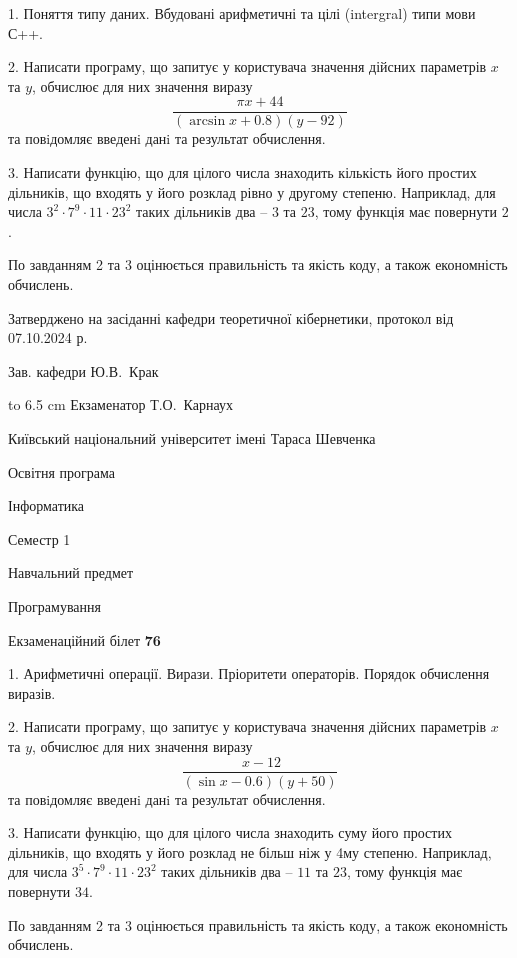 \documentclass[12pt, ukrainian]{article}
\begin{document}
{%
1. Поняття типу даних. Вбудовані арифметичні та цілі (intergral) типи мови С++.%
\par
2. Написати програму, що запитує у користувача значення дійсних параметрів $x$ та $y$, обчислює для них значення виразу 
$$\frac{\pi x + 44}{(\arcsin x + 0.8) (y - 92)}$$ 
та повiдомляє введенi данi та результат обчислення.

\par
3. Написати функцію, що для цілого числа знаходить кількість його простих дільників, що входять у його розклад рівно у другому степеню. Наприклад, для числа $3^2{\cdot}7^9{\cdot}11{\cdot}23^{2}$ таких дільників два – $3$ та $23$, тому функція має повернути $2$.

По завданням 2 та 3 оцінюється правильність та якість коду, а також економність обчислень.

}
{\smallskip\smallskip \begin {scriptsize} Затверджено на засіданні кафедри теоретичної кібернетики, протокол   від   07.10.2024 р.\par\smallskip\smallskip\smallskip\smallskip
{\parbox {6.5 cm} {Зав. кафедри \dotfill Ю.В.~Крак}}\hspace {0.7cm} {\hbox to 6.5 cm { Екзаменатор \dotfill Т.О.~Карнаух}} \end{scriptsize}}
\newpage
{{\begin {scriptsize}\par
{ \center  Київський національний університет імені Тараса Шевченка \par}
{\parbox {5 cm}{Освітня програма \hfill}{\parbox {7 cm}{Інформатика\hfill}}\parbox {6 cm}{\hfill Семестр 1}}\par
{\parbox {5 cm} {Навчальний предмет \hfill}\parbox {7 cm}{Програмування \hfill}\parbox {6cm}{\hfill}\par}\vspace{-15pt} \end{scriptsize}}{\center Екзаменаційний білет \No \textbf { 76 }\par}}
{%
1. Арифметичні операції. Вирази. Пріоритети операторів. Порядок обчислення виразів.%
\par
2. Написати програму, що запитує у користувача значення дійсних параметрів $x$ та $y$, обчислює для них значення виразу 
$$\frac{\ x - 12}{(\sin x - 0.6) (y + 50)}$$ 
та повiдомляє введенi данi та результат обчислення.

\par
3. Написати функцію, що для цілого числа знаходить суму його простих дільників, що входять у його розклад не більш ніж у 4му степеню. Наприклад, для числа $3^5{\cdot}7^9{\cdot}11{\cdot}23^{2}$ таких дільників два – $11$ та $23$, тому функція має повернути $34$.

По завданням 2 та 3 оцінюється правильність та якість коду, а також економність обчислень.

}
\end{document}
